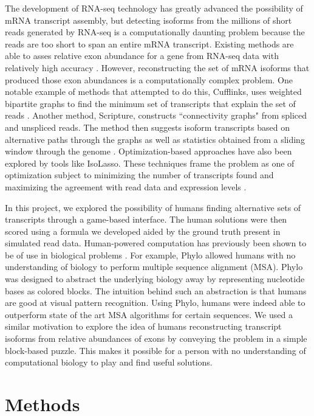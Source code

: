 \documentclass[12pt]{article}
\begin{document}
The development of RNA-seq technology has greatly advanced the possibility of mRNA transcript assembly, but detecting isoforms from the millions of short reads generated by RNA-seq is a computationally daunting problem because the reads are too short to span an entire mRNA transcript. Existing methods are able to asses relative exon abundance for a gene from RNA-seq data with relatively high accuracy \citep{trapnell2009tophat}. However, reconstructing the set of mRNA isoforms that produced those exon abundances is a computationally complex problem. One notable example of methods that attempted to do this, Cufflinks, uses weighted bipartite graphs to find the minimum set of transcripts that explain the set of reads \citep{trapnell2010transcript}. Another method, Scripture, constructs ``connectivity graphs" from spliced and unspliced reads. The method then suggests isoform transcripts based on alternative paths through the graphs as well as statistics obtained from a sliding window through the genome \citep{guttman2010ab}. Optimization-based approaches have also been explored by tools like IsoLasso. These techniques frame the problem as one of optimization subject to minimizing the number of transcripts found and maximizing the agreement with read data and expression levels \citep{li2011isolasso}.

In this project, we explored the possibility of humans finding alternative sets of transcripts through a game-based interface. The human solutions were then scored using a formula we developed aided by the ground truth present in simulated read data. Human-powered computation has previously been shown to be of use in biological problems \citep{kawrykow2012phylo, cooper2010predicting}. For example, Phylo allowed humans with no understanding of biology to perform multiple sequence alignment (MSA). Phylo was designed to abstract the underlying biology away by representing nucleotide bases as colored blocks.  The intuition behind such an abstraction is that humans are good at visual pattern recognition. Using Phylo, humans were indeed able to outperform state of the art MSA algorithms for certain sequences. We used a similar motivation to explore the idea of humans reconstructing transcript isoforms from relative abundances of exons by conveying the problem in a simple block-based puzzle. This makes it possible for a person with no understanding of computational biology to play and find useful solutions. 

\section*{Methods}
\end{document}
